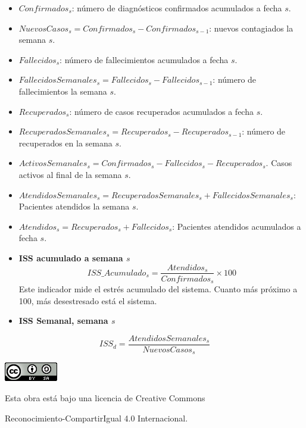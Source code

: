 \documentclass[
  11pt,
]{article}
\begin{document}
\begin{itemize}
\item
  \(Confirmados_s\): número de diagnósticos confirmados acumulados a
  fecha \(s\).
\item
  \(NuevosCasos_{s} = Confirmados_{s} - Confirmados_{s-1}\): nuevos
  contagiados la semana \(s\).
\item
  \(Fallecidos_s\): número de fallecimientos acumulados a fecha \(s\).
\item
  \(FallecidosSemanales_s = Fallecidos_{s} - Fallecidos_{s-1}\): número
  de fallecimientos la semana \(s\).
\item
  \(Recuperados_s\): número de casos recuperados acumulados a fecha
  \(s\).
\item
  \(RecuperadosSemanales_{s} = Recuperados_{s} - Recuperados_{s-1}\):
  número de recuperados en la semana \(s\).
\item
  \(ActivosSemanales_s = Confirmados_s - Fallecidos_s - Recuperados_s\).
  Casos activos al final de la semana \(s\).
\item
  \(AtendidosSemanales_{s} = RecuperadosSemanales_s + FallecidosSemanales_s\):
  Pacientes atendidos la semana \(s\).
\item
  \(Atendidos_{s} = Recuperados_s + Fallecidos_s\): Pacientes atendidos
  acumulados a fecha \(s\).
\item
  \textbf{ISS acumulado a semana \(s\)}
  \[ISS\_Acumulado_s = \frac{Atendidos_s}{Confirmados_s} \times 100\]
  Este indicador mide el estrés acumulado del sistema. Cuanto más
  próximo a 100, más desestresado está el sistema.
\item
  \textbf{ISS Semanal, semana \(s\)}
\end{itemize}

\[
ISS_d = \frac{AtendidosSemanales_s}{NuevosCasos_{s}}
\]

\vspace{4cm}

\begin{center}
\includegraphics{cc.png}
\end{center}

\vspace{0.2cm}

\begin{center}
Esta obra está bajo una licencia de Creative Commons 
\end{center}

\begin{center}
Reconocimiento-CompartirIgual 4.0 Internacional.
\end{center}
\end{document}

